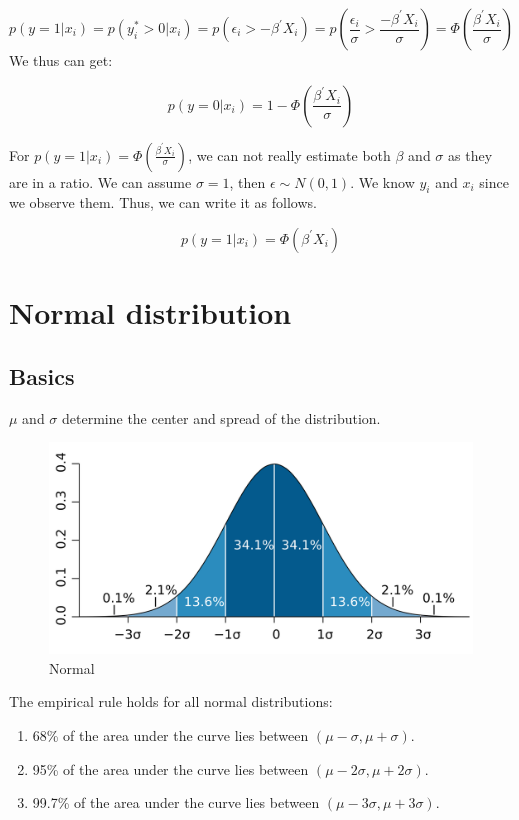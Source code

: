 \documentclass[]{book}
\begin{document}
\[p(y=1|x_i)= p(y_i^* >0|x_i)=p(\epsilon_i > -\beta^{'}X_i)= p(\frac{ \epsilon_i}{\sigma}>\frac{-\beta^{'}X_i}{\sigma})=\Phi(\frac{\beta^{'}X_i}{\sigma}) \]
We thus can get:

\[p(y=0|x_i)=1-\Phi(\frac{\beta^{'}X_i}{\sigma})\]

For \(p(y=1|x_i)=\Phi(\frac{\beta^{'}X_i}{\sigma})\), we can not really estimate both \(\beta\) and \(\sigma\) as they are in a ratio. We can assume \(\sigma =1\), then \(\epsilon \sim N(0,1)\).
We know \(y_i\) and \(x_i\) since we observe them. Thus, we can write it as follows.

\[p(y=1|x_i)=\Phi(\beta^{'}X_i)\]

\hypertarget{normal-distribution}{%
\chapter{Normal distribution}\label{normal-distribution}}

\hypertarget{basics-1}{%
\section{Basics}\label{basics-1}}

\(\mu\) and \(\sigma\) determine the center and spread of the distribution.

\begin{figure}
\centering
\includegraphics{Standard_deviation_diagram.PNG}
\caption{Normal}
\end{figure}

The empirical rule holds for all normal distributions:

\begin{enumerate}
\def\labelenumi{(\arabic{enumi})}
\item
  68\% of the area under the curve lies between \((\mu-\sigma,\mu+\sigma)\).
\item
  95\% of the area under the curve lies between \((\mu-2\sigma,\mu+2\sigma)\).
\item
  99.7\% of the area under the curve lies between \((\mu-3\sigma,\mu+3\sigma)\).
\end{enumerate}
\end{document}
